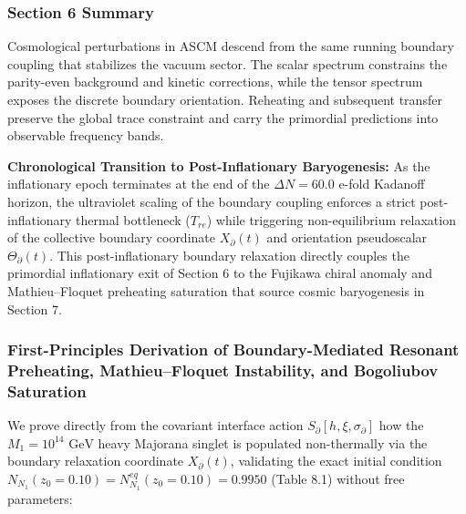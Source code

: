 \documentclass[aps,prd,onecolumn,superscriptaddress,nofootinbib,longbibliography,10pt]{revtex4-2}
\begin{document}
  
\subsubsection*{Section 6 Summary}

  Cosmological perturbations in ASCM descend from the same running boundary coupling that stabilizes the vacuum sector. The scalar spectrum constrains the parity-even background and kinetic corrections, while the tensor spectrum exposes the discrete boundary orientation. Reheating and subsequent transfer preserve the global trace constraint and carry the primordial predictions into observable frequency bands.


\textbf{Chronological Transition to Post-Inflationary Baryogenesis:} As the inflationary epoch terminates at the end of the \(\Delta N = 60.0\) e-fold Kadanoff horizon, the ultraviolet scaling of the boundary coupling enforces a strict post-inflationary thermal bottleneck (\(T_{re}\)) while triggering non-equilibrium relaxation of the collective boundary coordinate \(X_\partial(t)\) and orientation pseudoscalar \(\Theta_\partial(t)\). This post-inflationary boundary relaxation directly couples the primordial inflationary exit of Section 6 to the Fujikawa chiral anomaly and Mathieu--Floquet preheating saturation that source cosmic baryogenesis in Section 7.




 

  

\subsubsection*{First-Principles Derivation of Boundary-Mediated Resonant Preheating, Mathieu–Floquet Instability, and Bogoliubov Saturation}

We prove directly from the covariant interface action \(S_{\partial}[h,\xi,\sigma_{\partial}]\) how the \(M_1 = 10^{14}\text{ GeV}\) heavy Majorana singlet is populated non-thermally via the boundary relaxation coordinate \(X_{\partial}(t)\), validating the exact initial condition \(N_{N_1}(z_0 = 0.10) = N_{N_1}^{eq}(z_0 = 0.10) = 0.9950\) (Table 8.1) without free parameters:
\end{document}
